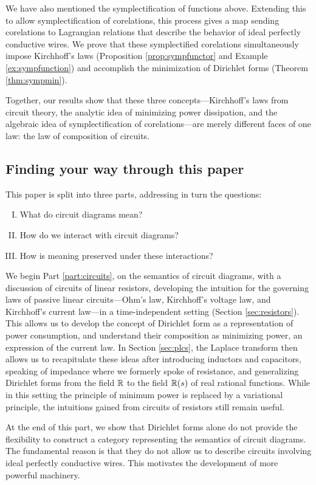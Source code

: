 We have also mentioned the symplectification of functions above.  Extending this to
allow symplectification of corelations, this process gives a map sending corelations
to Lagrangian relations that describe the behavior of ideal perfectly conductive wires. 
We prove that these symplectified corelations simultaneously impose Kirchhoff's 
laws (Proposition \ref{prop:sympfunctor} and Example \ref{ex:sympfunction}) and 
accomplish the minimization of Dirichlet forms (Theorem \ref{thm:sympmin}).  

Together, our results show that these three concepts---Kirchhoff's laws from circuit theory, 
the analytic idea of minimizing power dissipation, and the algebraic idea of symplectification of corelations---are merely different faces of one law: the law of composition of circuits.

\subsection{Finding your way through this paper}
This paper is split into three parts, addressing in turn the questions:
\begin{enumerate}[I.]
  \item What do circuit diagrams mean?
  \item How do we interact with circuit diagrams?
  \item How is meaning preserved under these interactions?
\end{enumerate}

We begin Part \ref{part:circuits}, on the semantics of circuit diagrams, with
a discussion of circuits of linear resistors, developing the intuition for the
governing laws of passive linear circuits---Ohm's law, Kirchhoff's voltage law,
and Kirchhoff's current law---in a time-independent setting (Section
\ref{sec:resistors}). This allows us to develop the concept of
Dirichlet form as a representation of power consumption, and understand their
composition as minimizing power, an expression of the current law. In Section
\ref{sec:plcs}, the Laplace transform then allows us to recapitulate these ideas
after introducing inductors and capacitors, speaking of impedance where we
formerly spoke of resistance, and generalizing Dirichlet forms from the field
${\mathbb{R}}$ to the field ${\mathbb{R}}(s)$ of real rational functions. While in this setting the
principle of minimum power is replaced by a variational principle,
the intuitions gained from circuits of resistors still remain useful. 

At the end of this part, we show that Dirichlet forms alone do not provide the 
flexibility to construct a category representing the semantics of circuit diagrams. 
The fundamental reason is that they do not allow us to describe circuits involving 
ideal perfectly conductive wires.  This motivates the development of more powerful machinery.

